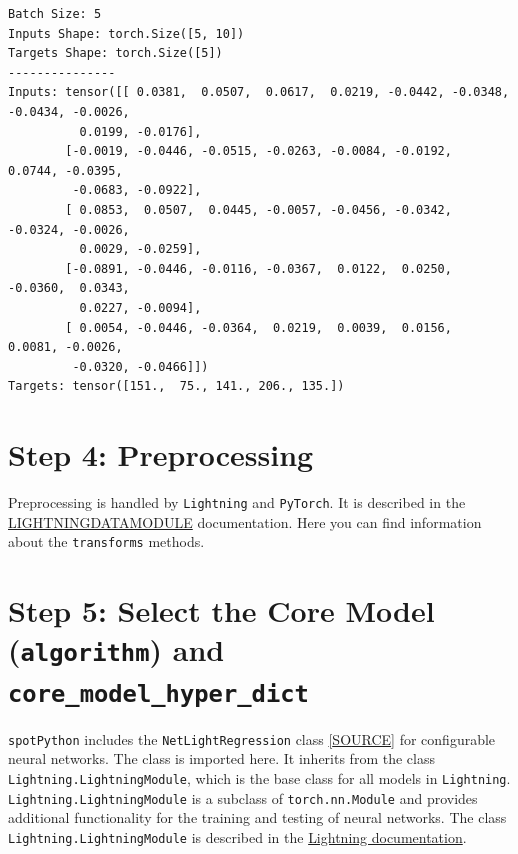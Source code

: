\documentclass[
  letterpaper,
  DIV=11,
  numbers=noendperiod]{scrreprt}
\begin{document}
\begin{tcolorbox}
\begin{verbatim}
Batch Size: 5
Inputs Shape: torch.Size([5, 10])
Targets Shape: torch.Size([5])
---------------
Inputs: tensor([[ 0.0381,  0.0507,  0.0617,  0.0219, -0.0442, -0.0348, -0.0434, -0.0026,
          0.0199, -0.0176],
        [-0.0019, -0.0446, -0.0515, -0.0263, -0.0084, -0.0192,  0.0744, -0.0395,
         -0.0683, -0.0922],
        [ 0.0853,  0.0507,  0.0445, -0.0057, -0.0456, -0.0342, -0.0324, -0.0026,
          0.0029, -0.0259],
        [-0.0891, -0.0446, -0.0116, -0.0367,  0.0122,  0.0250, -0.0360,  0.0343,
          0.0227, -0.0094],
        [ 0.0054, -0.0446, -0.0364,  0.0219,  0.0039,  0.0156,  0.0081, -0.0026,
         -0.0320, -0.0466]])
Targets: tensor([151.,  75., 141., 206., 135.])
\end{verbatim}

\end{tcolorbox}

\section{Step 4: Preprocessing}\label{sec-preprocessing-32}

Preprocessing is handled by \texttt{Lightning} and \texttt{PyTorch}. It
is described in the
\href{https://lightning.ai/docs/pytorch/stable/data/datamodule.html}{LIGHTNINGDATAMODULE}
documentation. Here you can find information about the
\texttt{transforms} methods.

\section{\texorpdfstring{Step 5: Select the Core Model
(\texttt{algorithm}) and
\texttt{core\_model\_hyper\_dict}}{Step 5: Select the Core Model (algorithm) and core\_model\_hyper\_dict}}\label{sec-selection-of-the-algorithm-32}

\texttt{spotPython} includes the \texttt{NetLightRegression} class
\href{https://github.com/sequential-parameter-optimization/spotPython/blob/main/src/spotPython/light/netlightregression.py}{{[}SOURCE{]}}
for configurable neural networks. The class is imported here. It
inherits from the class \texttt{Lightning.LightningModule}, which is the
base class for all models in \texttt{Lightning}.
\texttt{Lightning.LightningModule} is a subclass of
\texttt{torch.nn.Module} and provides additional functionality for the
training and testing of neural networks. The class
\texttt{Lightning.LightningModule} is described in the
\href{https://lightning.ai/docs/pytorch/stable/common/lightning_module.html}{Lightning
documentation}.
\end{document}
